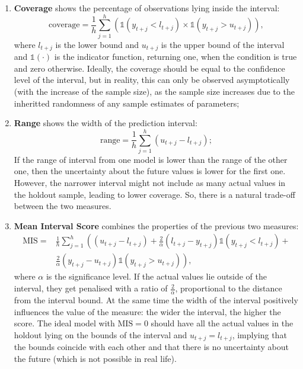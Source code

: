 \documentclass[]{book}
\providecommand{\tightlist}{%
  \setlength{\itemsep}{0pt}\setlength{\parskip}{0pt}}
\theoremstyle{definition}
\theoremstyle{definition}
\theoremstyle{definition}
\theoremstyle{definition}
\theoremstyle{remark}
\begin{document}
\begin{enumerate}
\def\labelenumi{\arabic{enumi}.}
\tightlist
\item
  \textbf{Coverage} shows the percentage of observations lying inside the interval:
  \begin{equation}
   \mathrm{coverage} = \frac{1}{h} \sum_{j=1}^h \left( \mathbb{1}(y_{t+j} < l_{t+j}) \times \mathbb{1}(y_{t+j} > u_{t+j}) \right),
   \label{eq:coverage}
  \end{equation}
  where \(l_{t+j}\) is the lower bound and \(u_{t+j}\) is the upper bound of the interval and \(\mathbb{1}(\cdot)\) is the indicator function, returning one, when the condition is true and zero otherwise. Ideally, the coverage should be equal to the confidence level of the interval, but in reality, this can only be observed asymptotically (with the increase of the sample size), as the sample size increases due to the inheritted randomness of any sample estimates of parameters;
\item
  \textbf{Range} shows the width of the prediction interval:
  \begin{equation}
   \mathrm{range} = \frac{1}{h} \sum_{j=1}^h (u_{t+j} -l_{t+j});
   \label{eq:range}
  \end{equation}
  If the range of interval from one model is lower than the range of the other one, then the uncertainty about the future values is lower for the first one. However, the narrower interval might not include as many actual values in the holdout sample, leading to lower coverage. So, there is a natural trade-off between the two measures.
\item
  \textbf{Mean Interval Score} \citep{Gneiting2007} combines the properties of the previous two measures:
  \begin{equation}
   \begin{aligned}
   \mathrm{MIS} = & \frac{1}{h} \sum_{j=1}^h \left( (u_{t+j} -l_{t+j}) + \frac{2}{\alpha} (l_{t+j} -y_{t+j}) \mathbb{1}(y_{t+j} < l_{t+j}) +\right. \\
   & \left. \frac{2}{\alpha} (y_{t+j} -u_{t+j}) \mathbb{1}(y_{t+j} > u_{t+j}) \right) ,
   \end{aligned}
   \label{eq:MIS}
  \end{equation}
  where \(\alpha\) is the significance level. If the actual values lie outside of the interval, they get penalised with a ratio of \(\frac{2}{\alpha}\), proportional to the distance from the interval bound. At the same time the width of the interval positively influences the value of the measure: the wider the interval, the higher the score. The ideal model with \(\mathrm{MIS}=0\) should have all the actual values in the holdout lying on the bounds of the interval and \(u_{t+j}=l_{t+j}\), implying that the bounds coincide with each other and that there is no uncertainty about the future (which is not possible in real life).

\end{enumerate}
\end{document}
